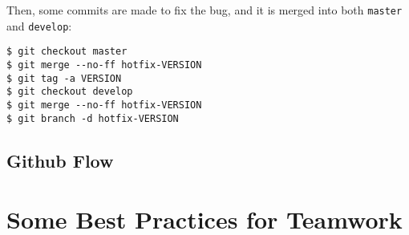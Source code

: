 \documentclass[12pt,a4paper]{article}
\begin{document}
Then, some commits are made to fix the bug, and it is merged into both
\texttt{master} and \texttt{develop}:

\begin{verbatim}
$ git checkout master
$ git merge --no-ff hotfix-VERSION
$ git tag -a VERSION
$ git checkout develop
$ git merge --no-ff hotfix-VERSION
$ git branch -d hotfix-VERSION
\end{verbatim}

\subsection{Github Flow}

\section{Some Best Practices for Teamwork}
\end{document}
